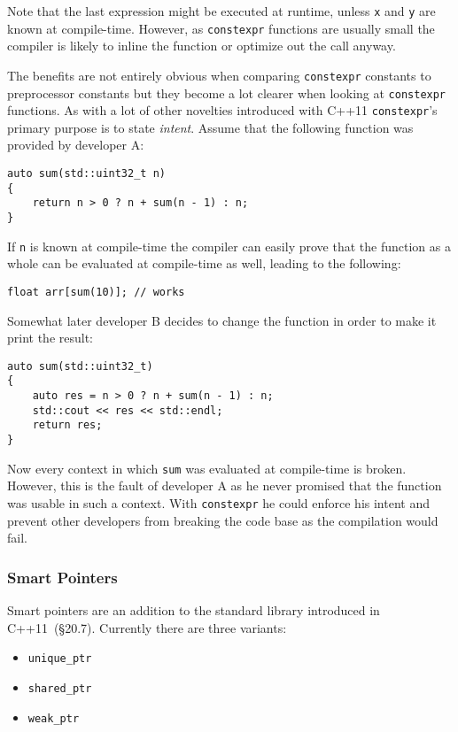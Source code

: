 Note that the last expression might be executed at runtime, unless \texttt{x} and \texttt{y} are known at compile-time. However, as \texttt{constexpr} functions are usually small the compiler is likely to inline the function or optimize out the call anyway.

The benefits are not entirely obvious when comparing \texttt{constexpr} constants to preprocessor constants but they become a lot clearer when looking at \texttt{constexpr} functions. As with a lot of other novelties introduced with C++11 \texttt{constexpr}'s primary purpose is to state \textit{intent}. Assume that the following function was provided by developer A:

\begin{lstlisting}
auto sum(std::uint32_t n)
{
    return n > 0 ? n + sum(n - 1) : n;
}
\end{lstlisting}

If \texttt{n} is known at compile-time the compiler can easily prove that the function as a whole can be evaluated at compile-time as well, leading to the following:

\begin{lstlisting}
float arr[sum(10)]; // works
\end{lstlisting}

Somewhat later developer B decides to change the function in order to make it print the result:

\begin{lstlisting}
auto sum(std::uint32_t)
{
    auto res = n > 0 ? n + sum(n - 1) : n;
    std::cout << res << std::endl;
    return res;
}
\end{lstlisting}

Now every context in which \texttt{sum} was evaluated at compile-time is broken. However, this is the fault of developer A as he never promised that the function was usable in such a context. With \texttt{constexpr} he could enforce his intent and prevent other developers from breaking the code base as the compilation would fail.

\subsubsection{Smart Pointers}\label{vec_add:smart_ptr}

Smart pointers are an addition to the standard library introduced in C++11~\cite{cpp11std}(§20.7). Currently there are three variants:
\begin{itemize}
\item \texttt{unique\_ptr}
\item \texttt{shared\_ptr}
\item \texttt{weak\_ptr}
\end{itemize}

